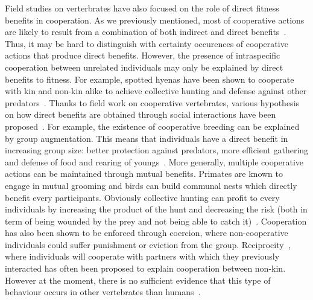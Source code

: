     Field studies on verterbrates have also focused on the role of direct fitness benefits in cooperation. As we previously mentioned, most of cooperative actions are likely to result from a combination of both indirect and direct benefits~\parencite{Clutton-Brock2009}. Thus, it may be hard to distinguish with certainty occurences of cooperative actions that produce direct benefits. However, the presence of intraspecific cooperation between unrelated individuals may only be explained by direct benefits to fitness. For example, spotted hyenas have been shown to cooperate with kin and non-kin alike to achieve collective hunting and defense against other predators~\parencite{Drea2009a, Smith2010, Smith2012a}. Thanks to field work on cooperative vertebrates, various hypothesis on how direct benefits are obtained through social interactions have been proposed~\parencite{Clutton-Brock2002}. For example, the existence of cooperative breeding can be explained by group augmentation. This means that individuals have a direct benefit in increasing group size: better protection against predators, more efficient gathering and defense of food and rearing of youngs~\parencite{Packer2001}. More generally, multiple cooperative actions can be maintained through mutual benefits. Primates are known to engage in mutual grooming and birds can build communal nests which directly benefit every participants. Obviously collective hunting can profit to every individuals by increasing the product of the hunt and decreasing the risk (both in term of being wounded by the prey and not being able to catch it)~\parencite{Scheel1991}. Cooperation has also been shown to be enforced through coercion, where non-cooperative individuals could suffer punishment or eviction from the group. Reciprocity~\parencite{Trivers1971}, where individuals will cooperate with partners with which they previously interacted has often been proposed to explain cooperation between non-kin. However at the moment, there is no sufficient evidence that this type of behaviour occurs in other vertebrates than humans~\parencite{Hammerstein2003, Clutton-Brock2009, Andre2014}.


